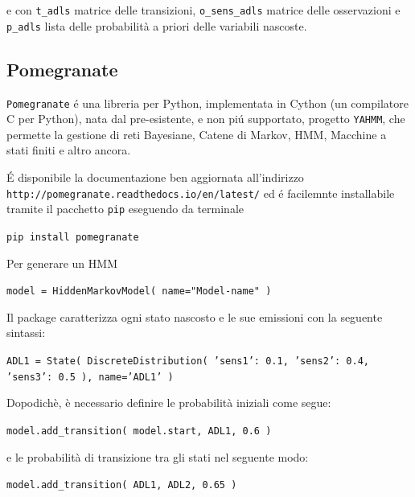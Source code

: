 \documentclass[12pt, a4paper]{scrartcl}
\begin{document}
e con \texttt{t\_adls} matrice delle transizioni, \texttt{o\_sens\_adls} matrice delle osservazioni e \texttt{p\_adls} lista delle probabilità a priori delle variabili nascoste.

\subsection*{Pomegranate}
\texttt{Pomegranate} é una libreria per Python, implementata in Cython (un compilatore C per Python), nata dal pre-esistente, e non piú supportato, progetto \texttt{YAHMM}, che permette la gestione di reti Bayesiane, Catene di Markov, HMM, Macchine a stati finiti e altro ancora. 

É disponibile la documentazione ben aggiornata all'indirizzo \\ \texttt{http://pomegranate.readthedocs.io/en/latest/} ed é facilemnte installabile tramite il pacchetto \texttt{pip} eseguendo da terminale 
\begin{center}\begin{addmargin}[2em]{2em}
\texttt{pip install pomegranate}
\end{addmargin}\end{center}

Per generare un HMM
\begin{center}\begin{addmargin}[2em]{2em}
\texttt{model = HiddenMarkovModel( name="Model-name" )}
\end{addmargin}\end{center}

Il package caratterizza ogni stato nascosto e le sue emissioni con la seguente sintassi:
\begin{center}\begin{addmargin}[2em]{2em}
\texttt{ADL1 = State( DiscreteDistribution({ 'sens1': 0.1, 'sens2': 0.4, 'sens3': 0.5 }), name='ADL1' )}
\end{addmargin}\end{center}

Dopodichè, è necessario definire le probabilità iniziali come segue:
\begin{center}\begin{addmargin}[2em]{2em}
\texttt{model.add\_transition( model.start, ADL1, 0.6 )}
\end{addmargin}\end{center}

e le probabilità di transizione tra gli stati nel seguente modo:
\begin{center}\begin{addmargin}[2em]{2em}
\texttt{model.add\_transition( ADL1, ADL2, 0.65 )}
\end{addmargin}\end{center}
\end{document}
